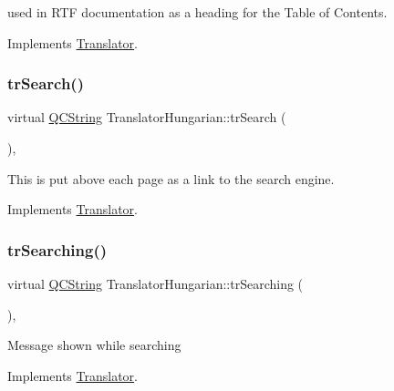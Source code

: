 used in R\+TF documentation as a heading for the Table of Contents. 

Implements \mbox{\hyperlink{class_translator}{Translator}}.

\mbox{\label{class_translator_hungarian_a56c477f2078dac838a509e1662d22f74}} 
\subsubsection{\texorpdfstring{trSearch()}{trSearch()}}
{\footnotesize\ttfamily virtual \mbox{\hyperlink{class_q_c_string}{Q\+C\+String}} Translator\+Hungarian\+::tr\+Search (\begin{DoxyParamCaption}{ }\end{DoxyParamCaption})\hspace{0.3cm}{\ttfamily [inline]}, {\ttfamily [virtual]}}

This is put above each page as a link to the search engine. 

Implements \mbox{\hyperlink{class_translator}{Translator}}.

\mbox{\label{class_translator_hungarian_a56e3524d8efc2abfec2c40de4e7d5602}} 
\subsubsection{\texorpdfstring{trSearching()}{trSearching()}}
{\footnotesize\ttfamily virtual \mbox{\hyperlink{class_q_c_string}{Q\+C\+String}} Translator\+Hungarian\+::tr\+Searching (\begin{DoxyParamCaption}{ }\end{DoxyParamCaption})\hspace{0.3cm}{\ttfamily [inline]}, {\ttfamily [virtual]}}

Message shown while searching 

Implements \mbox{\hyperlink{class_translator}{Translator}}.

\mbox{\label{class_translator_hungarian_a9723f96a4768f64d6d15011a00df5832}} 
